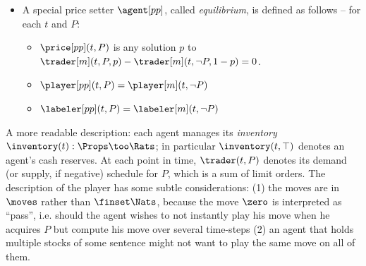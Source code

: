 \begin{definition}
\begin{itemize}
\begin{itemize}
            \item $\trader[m](t)=\sum_{\agent=\father(1),\dots\father(t)}\lambda_{\agent}\trader(t)$ where $\lambda_{\agent}$ is 1 if the following conditions are met (else 0): for all $P$, $\max_p-\trader(t,P,p)\le\inventory(t,P)$ and $\sum_P{\max_{p}{p\trader(t,P,p)}}\le\inventory(t,\top)$ (this sum is only a finite sum, because only finitely many agents have any cash at $t$)
            \item $\player[m](t,P,\concat{\code{\agent}}{l})=\player(t,P,l)$ where $\code{\agent}$ indicates some encoding for agents
            \item $\labeler[m](t,P,q)=
            \begin{cases}
                \concat{\father(t_q)}{\labeler[\father(t_q)](t,P)} & \text{if }t_q\le t \\
                \zero & \text{else}
            \end{cases}$ \\
            where $t_q$ is the smallest value such that $\sum_{s\le t_q}{\inventory[\father(s)](t,P)}\ge q$, if it exists, else $\infty$.
        \end{itemize}
        \item A special price setter $\agent[pp]$, called \emph{equilibrium}, is defined as follows -- for each $t$ and $P$:
        \begin{itemize}
            \item $\price[pp](t,P)$ is any solution $p$ to $\trader[m](t,P,p)-\trader[m](t,\lnot P,1-p)=0$.
            \item $\player[pp](t,P)=\player[m](t,\lnot P)$
            \item $\labeler[pp](t,P)=\labeler[m](t,\lnot P)$
        \end{itemize}
    \end{itemize}
    \label{nonvf:def:vfmarket}
\end{definition}

A more readable description: each agent manages its \emph{inventory} $\inventory(t):\Props\too\Rats$; in particular $\inventory(t,\top)$ denotes an agent's cash reserves. At each point in time, $\trader(t,P)$ denotes its demand (or supply, if negative) schedule for $P$, which is a sum of limit orders. The description of the player has some subtle considerations: (1) the moves are in $\moves$ rather than $\finset\Nats$, because the move $\zero$ is interpreted as ``pass'', i.e. should the agent wishes to not instantly play his move when he acquires $P$ but compute his move over several time-steps (2) an agent that holds multiple stocks of some sentence might not want to play the same move on all of them.

